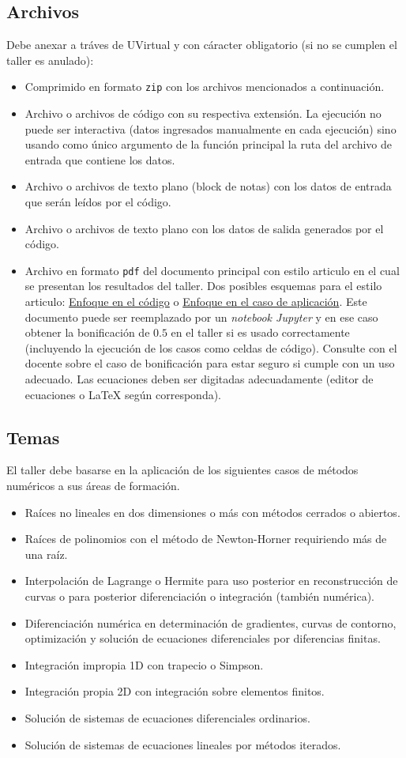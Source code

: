 \documentclass[12pt]{article}
\begin{document}
\subsection{Archivos}
Debe anexar a tráves de UVirtual y con cáracter obligatorio (si no se cumplen el taller es anulado):
\begin{itemize}
\item Comprimido en formato \verb-zip- con los archivos mencionados a continuación.
\item Archivo o archivos de código con su respectiva extensión. La ejecución no puede ser interactiva (datos ingresados manualmente en cada ejecución) sino usando como único argumento de la función principal la ruta del archivo de entrada que contiene los datos.
\item Archivo o archivos de texto plano (block de notas) con los datos de entrada que serán leídos por el código.
\item Archivo o archivos de texto plano con los datos de salida generados por el código.
\item Archivo en formato \verb-pdf- del documento principal con estilo articulo en el cual se presentan los resultados del taller. Dos posibles esquemas para el estilo articulo: \href{http://www.sciencedirect.com/science/article/pii/S0010465516301254}{Enfoque en el código} o \href{https://arxiv.org/pdf/1205.3445.pdf}{Enfoque en el caso de aplicación}. Este documento puede ser reemplazado por un \textit{notebook Jupyter} y en ese caso obtener la bonificación de \(0.5\) en el taller si es usado correctamente (incluyendo la ejecución de los casos como celdas de código). Consulte con el docente sobre el caso de bonificación para estar seguro si cumple con un uso adecuado. Las ecuaciones deben ser digitadas adecuadamente (editor de ecuaciones o LaTeX según corresponda).
\end{itemize}
\subsection{Temas}
El taller debe basarse en la aplicación de los siguientes casos de métodos numéricos a sus áreas de formación.
\begin{itemize}
\item Raíces no lineales en dos dimensiones o más con métodos cerrados o abiertos.
\item Raíces de polinomios con el método de Newton-Horner requiriendo más de una raíz.
\item Interpolación de Lagrange o Hermite para uso posterior en reconstrucción de curvas o para posterior diferenciación o integración (también numérica).
\item Diferenciación numérica en determinación de gradientes, curvas de contorno, optimización y solución de ecuaciones diferenciales por diferencias finitas.
\item Integración impropia 1D con trapecio o Simpson.
\item Integración propia 2D con integración sobre elementos finitos.
\item Solución de sistemas de ecuaciones diferenciales ordinarios.
\item Solución de sistemas de ecuaciones lineales por métodos iterados.
\end{itemize}
\end{document}
